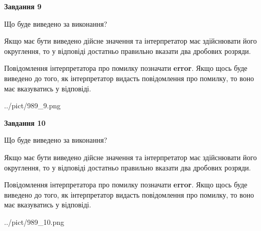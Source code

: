 \documentclass[12pt, ukrainian]{article}
\begin{document}
{\begin {Large}
{\begin {center}\textbf{Завдання 9}\end {center}}\par
Що буде виведено за виконання? \par

Якщо має бути виведено дійсне значення та інтерпретатор має здійснювати його округлення, 
то у відповіді достатньо правильно вказати два дробових розряди.

Повідомлення інтерпретатора про помилку позначати \textbf{error}.
Якщо щось буде виведено до того, як інтерпретатор видасть повідомлення про помилку, 
то воно має вказуватись у відповіді. \par

\begin{center}
	{../pict/989_9.png}
\end{center}
\newpage

{\begin {center}\textbf{Завдання 10}\end {center}}\par
Що буде виведено за виконання? \par

Якщо має бути виведено дійсне значення та інтерпретатор має здійснювати його округлення, 
то у відповіді достатньо правильно вказати два дробових розряди.

Повідомлення інтерпретатора про помилку позначати \textbf{error}.
Якщо щось буде виведено до того, як інтерпретатор видасть повідомлення про помилку, 
то воно має вказуватись у відповіді. \par

\begin{center}
	{../pict/989_10.png}
\end{center}
\newpage

\end {Large}}
\end{document}
